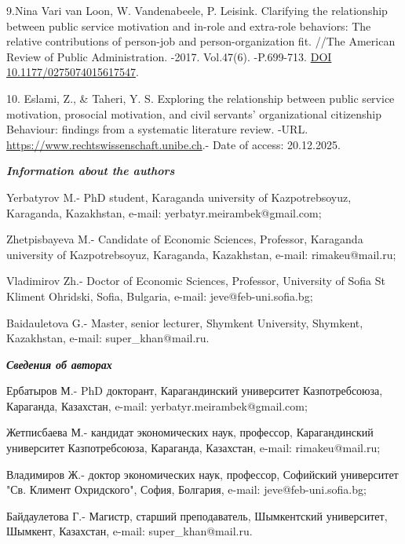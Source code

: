 \begin{refs}
9.Nina Vari van Loon, W. Vandenabeele, P. Leisink. Clarifying the
relationship between public service motivation and in-role and
extra-role behaviors: The relative contributions of person-job and
person-organization fit. //The American Review of Public Administration.
-2017. Vol.47(6). -P.699-713.
\href{https://doi.org/10.1177/0275074015617547}{DOI
10.1177/0275074015617547}.

10. Eslami, Z., \& Taheri, Y. S. Exploring the relationship between
public service motivation, prosocial motivation, and civil servants'
organizational citizenship Behaviour: findings from a systematic
literature review. -URL.
\href{https://www.rechtswissenschaft.unibe.ch/unibe/portal/fak\_rechtwis/content/e6024/e6025/e118744/e1190006/e1416330/pane1727015/e1416332/files1416356/MA\_Eslami\_Taheri\_23.01.2023\_ger.pdf}{https://www.rechtswissenschaft.unibe.ch}.-
Date of access: 20.12.2025.
\end{refs}

\begin{info}
\hspace{1em}\emph{{\bfseries Information about the authors}}

Yerbatyrov M.- PhD student, Karaganda university of Kazpotrebsoyuz,
Karaganda, Kazakhstan, e-mail: yerbatyr.meirambek@gmail.com;

Zhetpisbayeva M.- Candidate of Economic Sciences, Professor, Karaganda
university of Kazpotrebsoyuz, Karaganda, Kazakhstan, e-mail:
rimakeu@mail.ru;

Vladimirov Zh.- Doctor of Economic Sciences, Professor, University of
Sofia St Kliment Ohridski, Sofia, Bulgaria, e-mail:
jeve@feb-uni.sofia.bg;

Baidauletova G.- Master, senior lecturer, Shymkent University,
Shymkent, Kazakhstan, e-mail: super\_khan@mail.ru.

\hspace{1em}\emph{{\bfseries Сведения об авторах}}

Ербатыров М.- PhD докторант, Карагандинский университет
Казпотребсоюза, Караганда, Казахстан, e-mail:
yerbatyr.meirambek@gmail.com;

Жетписбаева М.- кандидат экономических наук, профессор, Карагандинский
университет Казпотребсоюза, Караганда, Казахстан, e-mail:
rimakeu@mail.ru;

Владимиров Ж.- доктор экономических наук, профессор, Софийский
университет "Св. Климент Охридского", София, Болгария, e-mail:
jeve@feb-uni.sofia.bg;

Байдаулетова Г.- Магистр, старший преподаватель, Шымкентский
университет, Шымкент, Казахстан, e-mail: super\_khan@mail.ru.
\end{info}
